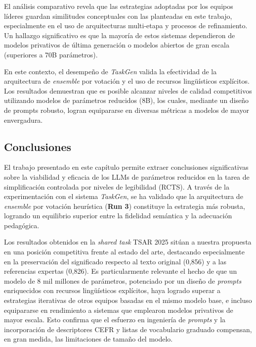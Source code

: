 El análisis comparativo revela que las estrategias adoptadas por los equipos líderes guardan similitudes conceptuales con las planteadas en este trabajo, especialmente en el uso de arquitecturas multi-etapa y procesos de refinamiento. Un hallazgo significativo es que la mayoría de estos sistemas dependieron de modelos privativos de última generación o modelos abiertos de gran escala (superiores a 70B parámetros).

En este contexto, el desempeño de \textit{TaskGen} valida la efectividad de la arquitectura de \textit{ensemble} por votación y el uso de recursos lingüísticos explícitos. Los resultados demuestran que es posible alcanzar niveles de calidad competitivos utilizando modelos de parámetros reducidos (8B), los cuales, mediante un diseño de prompts robusto, logran equipararse en diversas métricas a modelos de mayor envergadura.

\subsection{Conclusiones}\label{sec:ad_conclusiones}

El trabajo presentado en este capítulo permite extraer conclusiones significativas sobre la viabilidad y eficacia de los LLMs de parámetros reducidos en la tarea de simplificación controlada por niveles de legibilidad (RCTS). A través de la experimentación con el sistema \textit{TaskGen}, se ha validado que la arquitectura de \textit{ensemble} por votación heurística (\textbf{Run 3}) constituye la estrategia más robusta, logrando un equilibrio superior entre la fidelidad semántica y la adecuación pedagógica.

Los resultados obtenidos en la \textit{shared task} TSAR 2025 sitúan a nuestra propuesta en una posición competitiva frente al estado del arte, destacando especialmente en la preservación del significado respecto al texto original (0,856) y a las referencias expertas (0,826). Es particularmente relevante el hecho de que un modelo de 8 mil millones de parámetros, potenciado por un diseño de \textit{prompts} enriquecidos con recursos lingüísticos explícitos, haya logrado superar a estrategias iterativas de otros equipos basadas en el mismo modelo base, e incluso equipararse en rendimiento a sistemas que emplearon modelos privativos de mayor escala. Esto confirma que el esfuerzo en ingeniería de \textit{prompts} y la incorporación de descriptores CEFR y listas de vocabulario graduado compensan, en gran medida, las limitaciones de tamaño del modelo.

